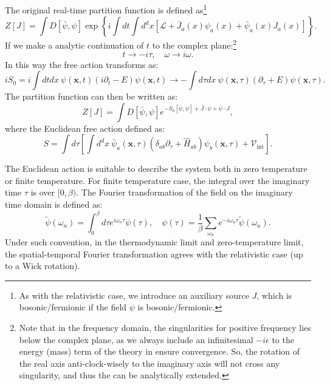 The original real-time partition function is defined as\footnote{As with the relativistic case, we introduce an auxiliary source $J$, which is bosonic/fermionic if the field $\psi$ is bosonic/fermionic.
}
\begin{equation}
	Z[J] = \int D[\bar\psi,\psi] \exp\left\{i\int dt \int d^dx \left[\mathcal{L}+\bar{J}_a(x)\psi_a(x)+\bar{\psi}_a(x)J_a(x)\right]\right\}.
\end{equation}
If we make a analytic continuation of $t$ to the complex plane:\footnote{Note that in the frequency domain, the singularities for positive frequency lies below the complex plane, as we always include an infinitesimal $-i\epsilon$ to the energy (mass) term of the theory in ensure convergence. So, the rotation of the real axis anti-clock-wisely to the imaginary axis will not cross any singularity, and thus the can be analytically extended.}
\begin{equation}
	t \rightarrow -i\tau, \quad \omega \rightarrow i\omega.
\end{equation}
In this way the free action transforms as:
\begin{equation*}
	iS_0 = i \int dt dx\ \psi(\bm x, t) (i\partial_t - E) \psi(\bm x, t) \rightarrow 
	-\int d\tau dx\ \psi(\bm x, \tau) (\partial_\tau + E) \psi(\bm x, \tau).
\end{equation*}
The partition function can then be written as:
\begin{equation}
	Z[J] = \int D[\bar\psi,\psi] e^{-S_0[\bar\psi,\psi]+\bar{J}\cdot\psi+\bar{\psi}\cdot J},
\end{equation}
where the Euclidean free action defined as:
\begin{equation}
	S = \int d\tau \left[\int d^dx\ \bar\psi_a(\bm x,\tau) (\delta_{ab}\partial_\tau+\hat H_{ab})\psi_b(\bm x,\tau) + \mathcal{V}_\mathrm{int}\right].
\end{equation}

The Euclidean action is suitable to describe the system both in zero temperature or finite temperature.
For finite temperature case, the integral over the imaginary time $\tau$ is over $[0,\beta)$.
The Fourier transformation of the field on the imaginary time domain is defined as:
\begin{equation}
	\tilde\psi(\omega_n) = \int_0^\beta d\tau e^{i\omega_n\tau} \psi(\tau),\quad
	\psi(\tau) = \frac{1}{\beta}\sum_{\omega_n} e^{-i\omega_n\tau} \tilde\psi(\omega_n).
\end{equation}
Under such convention, in the thermodynamic limit and zero-temperature limit, the spatial-temporal Fourier transformation agrees with the relativistic case (up to a Wick rotation).



